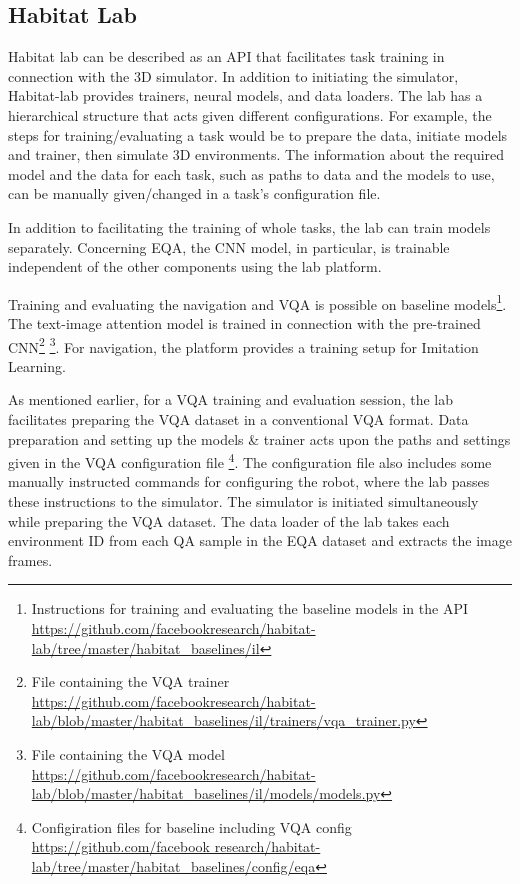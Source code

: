 \subsection{Habitat Lab}

Habitat lab can be described as an API that facilitates task training in connection with the 3D simulator. In addition to initiating the simulator, Habitat-lab provides trainers, neural models, and data loaders. The lab has a hierarchical structure that acts given different configurations. For example, the steps for training/evaluating a task would be to prepare the data, initiate models and trainer, then simulate 3D environments. The information about the required model and the data for each task, such as paths to data and the models to use, can be manually given/changed in a task’s configuration file.

In addition to facilitating the training of whole tasks, the lab can train models separately. Concerning EQA,  the CNN model, in particular, is trainable independent of the other components using the lab platform. 

Training and evaluating the navigation and VQA is possible on baseline models\footnote{Instructions for training and evaluating the baseline models in the API \url{https://github.com/facebookresearch/habitat-lab/tree/master/habitat_baselines/il}}.
The text-image attention model is trained in connection with the pre-trained CNN\footnote{ File containing the VQA trainer \url{https://github.com/facebookresearch/habitat-lab/blob/master/habitat_baselines/il/trainers/vqa_trainer.py}} \footnote{ File containing the VQA model \url{https://github.com/facebookresearch/habitat-lab/blob/master/habitat_baselines/il/models/models.py}}. For navigation, the platform provides a training setup for Imitation Learning. 

As mentioned earlier, for a VQA training and evaluation session, the lab facilitates preparing the VQA dataset in a conventional VQA format. Data preparation and setting up the models \& trainer acts upon the paths and settings given in the VQA configuration file \footnote{Configiration files for baseline including VQA config \url{https://github.com/facebook research/habitat-lab/tree/master/habitat\_baselines/config/eqa}}. The configuration file also includes some manually instructed commands for configuring the robot, where the lab passes these instructions to the simulator. The simulator is initiated simultaneously while preparing the VQA dataset. The data loader of the lab takes each environment ID from each QA sample in the EQA dataset and extracts the image frames. 

